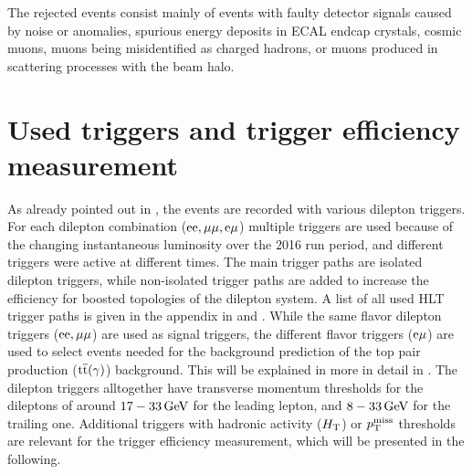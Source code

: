 The rejected events consist mainly of events with faulty detector signals caused by noise or anomalies, spurious energy deposits in ECAL endcap crystals, cosmic muons, muons being misidentified as charged hadrons, or muons produced in scattering processes with the beam halo.


\section{Used triggers and trigger efficiency measurement}\label{sec:triggEff}
As already pointed out in , the events are recorded with various dilepton triggers. For each dilepton combination ($\mathrm{e}\mathrm{e},{\mu}{\mu},\mathrm{e}{\mu}$) multiple triggers are used because of the changing instantaneous luminosity over the 2016 run period, and different triggers were active at different times. The main trigger paths are isolated dilepton triggers, while non-isolated trigger paths are added to increase the efficiency for boosted topologies of the dilepton system. A list of all used HLT trigger paths is given in the appendix in  and . While the same flavor dilepton triggers ($\mathrm{e}\mathrm{e},{\mu}{\mu}$) are used as signal triggers, the different flavor triggers ($\mathrm{e}{\mu}$) are used to select events needed for the background prediction of the top pair production (${\mathrm{t}\overline{\mathrm{t}}}(\gamma)$) background. This will be explained in more in detail in . The dilepton triggers alltogether have transverse momentum thresholds for the dileptons of around $17-33\,\text{Ge\hspace{-.08em}V}$ for the leading lepton, and $8-33\,\text{Ge\hspace{-.08em}V}$ for the trailing one. Additional triggers with hadronic activity ($H_{\mathrm{T}}$) or $p_{\mathrm{T}}^\text{miss}$ thresholds are relevant for the trigger efficiency measurement, which will be presented in the following.

